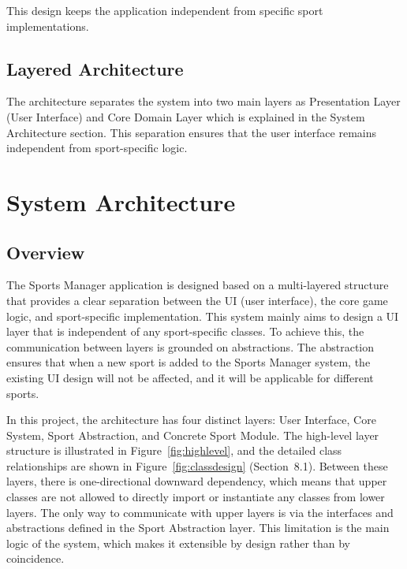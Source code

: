 \documentclass[12pt, a4paper]{article}
\begin{document}
This design keeps the application independent from specific sport implementations.

\subsection{Layered Architecture}

The architecture separates the system into two main layers as Presentation Layer (User
Interface) and Core Domain Layer which is explained in the System Architecture section.
This separation ensures that the user interface remains independent from sport-specific logic.

\section{System Architecture}

\subsection{Overview}

The Sports Manager application is designed based on a multi-layered structure that provides a
clear separation between the UI (user interface), the core game logic, and sport-specific
implementation. This system mainly aims to design a UI layer that is independent of any
sport-specific classes. To achieve this, the communication between layers is grounded on
abstractions. The abstraction ensures that when a new sport is added to the Sports Manager
system, the existing UI design will not be affected, and it will be applicable for different sports.

In this project, the architecture has four distinct layers: User Interface, Core System, Sport
Abstraction, and Concrete Sport Module. The high-level layer structure is illustrated in
Figure~\ref{fig:highlevel}, and the detailed class relationships are shown in Figure~\ref{fig:classdesign}
(Section~8.1). Between these layers, there is one-directional downward dependency, which
means that upper classes are not allowed to directly import or instantiate any classes from
lower layers. The only way to communicate with upper layers is via the interfaces and
abstractions defined in the Sport Abstraction layer. This limitation is the main logic of the
system, which makes it extensible by design rather than by coincidence.
\end{document}
